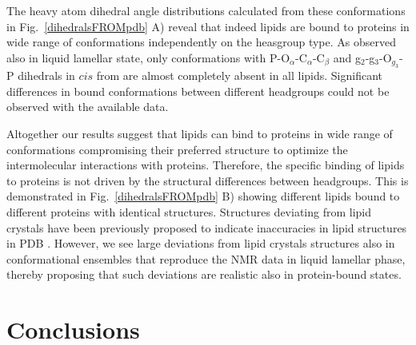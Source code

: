 \documentclass[aps,prl,superscriptaddress,twocolumn]{revtex4}
\begin{document}
The heavy atom dihedral angle distributions calculated from these conformations 
in Fig.~\ref{dihedralsFROMpdb} A) reveal that indeed lipids are bound to proteins in wide
range of conformations independently on the heasgroup type.
As observed also in liquid lamellar state, only conformations
with P-O$_\alpha$-C$_\alpha$-C$_\beta$ and g$_2$-g$_3$-O$_{g_3}$-P dihedrals in $cis$ from are almost
completely absent in all lipids.
Significant differences in bound conformations between different headgroups could not be
observed with the available data.

Altogether our results suggest that lipids can bind to proteins in wide range of conformations
compromising their preferred structure to optimize the intermolecular interactions with proteins.
Therefore, the specific binding of lipids to proteins is not driven by the structural differences between
headgroups. This is demonstrated in Fig.~\ref{dihedralsFROMpdb} B) showing different lipids bound
to different proteins with identical structures.
Structures deviating from lipid crystals
have been previously proposed to indicate inaccuracies in lipid structures in PDB \cite{marsh13b,pezeshkian18}. 
However, we see large deviations from lipid crystals structures also in conformational ensembles
that reproduce the NMR data in liquid lamellar phase, thereby proposing that such deviations
are realistic also in protein-bound states.

\section{Conclusions}
\end{document}
